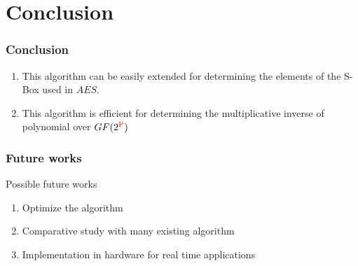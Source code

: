 \documentclass[12pt]{beamer}
\def\SP#1{\textsuperscript{\textcolor{red}{#1}}}
\begin{document}
\section{Conclusion}
\begin{frame}
\frametitle{Conclusion}
	\begin{enumerate}
		   \item This algorithm can be easily extended for determining the elements of the S-Box used in $AES$.
	   \item This algorithm is efficient for determining the multiplicative inverse of polynomial over $GF(2\SP{P})$
	\end{enumerate}
\end{frame}

\begin{frame}
\frametitle{Future works}
  \begin{block}{Possible future works}
  	\begin{enumerate}
  		\item Optimize the algorithm
  		\item Comparative study with many existing algorithm
  		\item Implementation in hardware for real time applications
  	\end{enumerate}
  \end{block}
\end{frame}


\end{document}
